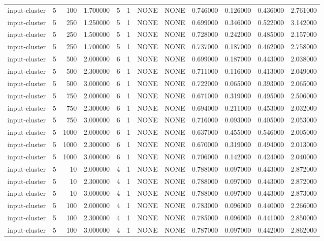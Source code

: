 \begin{tabular}{lrrrllllrrrr}
input-cluster & 5 & 100 & 1.700000 & 5 & 1 & NONE & NONE & 0.746000 & 0.126000 & 0.436000 & 2.761000 \\
input-cluster & 5 & 250 & 1.250000 & 5 & 1 & NONE & NONE & 0.699000 & 0.346000 & 0.522000 & 3.142000 \\
input-cluster & 5 & 250 & 1.500000 & 5 & 1 & NONE & NONE & 0.728000 & 0.242000 & 0.485000 & 2.157000 \\
input-cluster & 5 & 250 & 1.700000 & 5 & 1 & NONE & NONE & 0.737000 & 0.187000 & 0.462000 & 2.758000 \\
input-cluster & 5 & 500 & 2.000000 & 6 & 1 & NONE & NONE & 0.699000 & 0.187000 & 0.443000 & 2.038000 \\
input-cluster & 5 & 500 & 2.300000 & 6 & 1 & NONE & NONE & 0.711000 & 0.116000 & 0.413000 & 2.049000 \\
input-cluster & 5 & 500 & 3.000000 & 6 & 1 & NONE & NONE & 0.722000 & 0.065000 & 0.393000 & 2.065000 \\
input-cluster & 5 & 750 & 2.000000 & 6 & 1 & NONE & NONE & 0.671000 & 0.319000 & 0.495000 & 2.506000 \\
input-cluster & 5 & 750 & 2.300000 & 6 & 1 & NONE & NONE & 0.694000 & 0.211000 & 0.453000 & 2.032000 \\
input-cluster & 5 & 750 & 3.000000 & 6 & 1 & NONE & NONE & 0.716000 & 0.093000 & 0.405000 & 2.053000 \\
input-cluster & 5 & 1000 & 2.000000 & 6 & 1 & NONE & NONE & 0.637000 & 0.455000 & 0.546000 & 2.005000 \\
input-cluster & 5 & 1000 & 2.300000 & 6 & 1 & NONE & NONE & 0.670000 & 0.319000 & 0.494000 & 2.013000 \\
input-cluster & 5 & 1000 & 3.000000 & 6 & 1 & NONE & NONE & 0.706000 & 0.142000 & 0.424000 & 2.040000 \\
input-cluster & 5 & 10 & 2.000000 & 4 & 1 & NONE & NONE & 0.788000 & 0.097000 & 0.443000 & 2.872000 \\
input-cluster & 5 & 10 & 2.300000 & 4 & 1 & NONE & NONE & 0.788000 & 0.097000 & 0.443000 & 2.872000 \\
input-cluster & 5 & 10 & 3.000000 & 4 & 1 & NONE & NONE & 0.788000 & 0.097000 & 0.443000 & 2.873000 \\
input-cluster & 5 & 100 & 2.000000 & 4 & 1 & NONE & NONE & 0.783000 & 0.096000 & 0.440000 & 2.266000 \\
input-cluster & 5 & 100 & 2.300000 & 4 & 1 & NONE & NONE & 0.785000 & 0.096000 & 0.441000 & 2.850000 \\
input-cluster & 5 & 100 & 3.000000 & 4 & 1 & NONE & NONE & 0.787000 & 0.097000 & 0.442000 & 2.862000 \\

\end{tabular}
